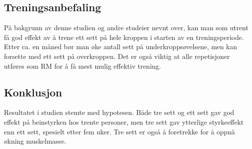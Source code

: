 \documentclass[
]{book}
\begin{document}
\hypertarget{treningsanbefaling}{%
\subsection{Treningsanbefaling}\label{treningsanbefaling}}

På bakgrunn av denne studien og andre studeier nevnt over, kan man som utrent få god effekt av å trene ett sett på hele kroppen i starten av en treningsperiode. Etter ca. en måned bør man øke antall sett på underkroppsøvelsene, men kan forsette med ett sett på overkroppen. Det er også viktig at alle repetisjoner utføres som RM for å få mest mulig effektiv trening.

\hypertarget{konklusjon}{%
\subsection{Konklusjon}\label{konklusjon}}

Resultatet i studien stemte med hypotesen. Både tre sett og ett sett gav god effekt på beinstyrken hos trente personer, men tre sett gav ytterlige styrkeeffekt enn ett sett, spesielt etter fem uker. Tre sett er også å foretrekke for å oppnå økning muskelmasse.

  
\end{document}
